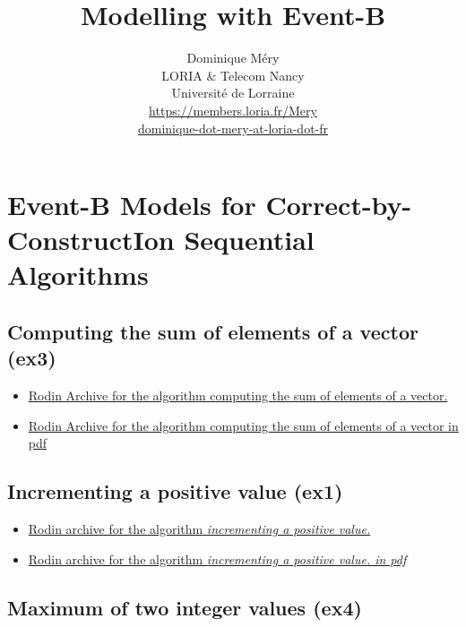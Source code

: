 \documentclass[ 12pt]{article}
\title{Modelling with Event-B}
\author{Dominique M\'ery\\
LORIA \& Telecom Nancy\\ Universit\'e de Lorraine\\
\url{https://members.loria.fr/Mery}\\ \url{dominique-dot-mery-at-loria-dot-fr}}
\begin{document}
  \setcounter{ex}{1}
\maketitle



\section{Event-B Models  for Correct-by-ConstructIon Sequential Algorithms}
\label{sec:last-news}

\subsection{ Computing the sum of elements of a vector (ex3)}
\label{sec:comp-sum-elem}


\begin{itemize}
\item[] 
  \href{https://mery54.github.io/mery/eventb/ex3.zip}{Rodin Archive 
    for  the algorithm  computing the sum of elements of a vector.}
\item   \href{https://mery54.github.io/mery/eventb/ex3.pdf}{Rodin Archive 
    for  the algorithm  computing the sum of elements of a vector in
    pdf }

\end{itemize}



\subsection{Incrementing a positive value (ex1)}
\label{sec:comp-sum-elem}


\begin{itemize}
\item[] 
  \href{https://mery54.github.io/mery/eventb/ex1.zip}{Rodin archive 
    for the algorithm \textit{ incrementing a positive value.}}

 \item[] 
  \href{https://mery54.github.io/mery/eventb/ex1.pdf}{Rodin archive 
        for the algorithm \textit{ incrementing a positive value. in pdf}} 
    
\end{itemize}



\subsection{Maximum of two integer values (ex4)}
\label{sec:comp-sum-elem}
\end{document}
